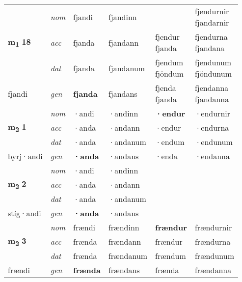 \begin{longtable}[l]{X>{\footnotesize\itshape}XXXXX}
\multirow{3}{*}{{{\textbf{m{\textsubscript{1}}} \Large{\textbf{18}}}}} & nom & fjandi & fjandinn & \textbf{\specialcell{fjendur\\ fjandar}} & \specialcell{fjendurnir\\ fjandarnir} \\*
 & acc & fjanda & fjandann & \specialcell{fjendur\\ fjanda} & \specialcell{fjendurna\\ fjandana} \\*
 & dat & fjanda & fjandanum & \specialcell{fjendum\\ fjöndum} & \specialcell{fjendunum\\ fjöndunum} \\*
 {\footnotesize{fjandi}} & gen & \textbf{fjanda} & fjandans & \specialcell{fjenda\\ fjanda} & \specialcell{fjendanna\\ fjandanna} \\
\cmidrule{1-6}

\multirow{3}{*}{{{\textbf{m{\textsubscript{2}}} \Large{\textbf{1}}}}} & nom & ·andi & ·andinn & \textbf{·endur} & ·endurnir \\*
 & acc & ·anda & ·andann & ·endur & ·endurna \\*
 & dat & ·anda & ·andanum & ·endum & ·endunum \\*
 {\footnotesize{byrj\allowbreak ·andi}} & gen & \textbf{·anda} & ·andans & ·enda & ·endanna \\
\cmidrule{1-6}

\multirow{3}{*}{{{\textbf{m{\textsubscript{2}}} \Large{\textbf{2}}}}} & nom & ·andi & ·andinn & \textbf{} &  \\*
 & acc & ·anda & ·andann &  &  \\*
 & dat & ·anda & ·andanum &  &  \\*
 {\footnotesize{stíg\allowbreak ·andi}} & gen & \textbf{·anda} & ·andans &  &  \\
\cmidrule{1-6}

\multirow{3}{*}{{{\textbf{m{\textsubscript{2}}} \Large{\textbf{3}}}}} & nom & frændi & frændinn & \textbf{frændur} & frændurnir \\*
 & acc & frænda & frændann & frændur & frændurna \\*
 & dat & frænda & frændanum & frændum & frændunum \\*
 {\footnotesize{frændi}} & gen & \textbf{frænda} & frændans & frænda & frændanna \\
\cmidrule{1-6}


\end{longtable}
